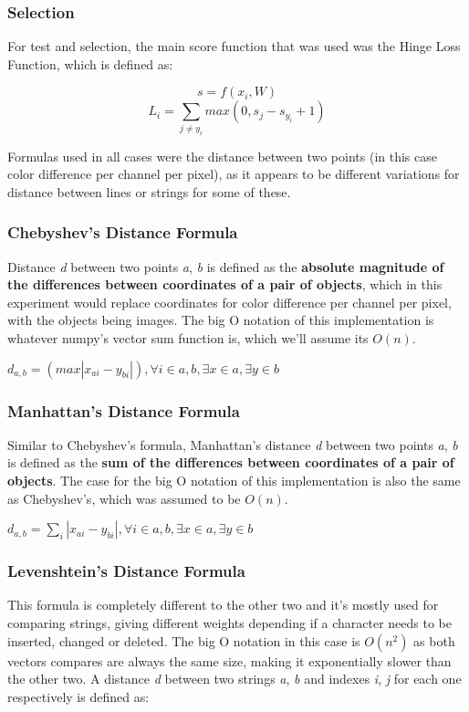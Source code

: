 \documentclass[conference,compsoc]{IEEEtran}
\begin{document}
\subsubsection{Selection}
For test and selection, the main score function that was used was the Hinge Loss Function, which is defined as:

\[ s = f(x_i, W) \]
\[L_{i} = \sum\limits_{j \ne y_i}max(0, s_j - s_{y_i} + 1)\]



Formulas used in all cases were the distance between two points (in this case color difference per channel per pixel), as it appears to be different variations for distance between lines or strings for some of these.
\subsubsection{Chebyshev's Distance Formula}
Distance \textit{d} between two points \textit{a}, \textit{b} is defined as the \textbf{absolute magnitude of the differences between coordinates of a pair of objects}, which in this experiment would replace coordinates for color difference per channel per pixel, with the objects being images. The big O notation of this implementation is whatever numpy's vector sum function is, which we'll assume its $O(n)$.

\vspace{3mm}
\(d_{a,b} =(max |x_{ai} - y_{bi}|),  \forall i \in a,b, \exists x \in a, \exists y \in b \)

\subsubsection{Manhattan's Distance Formula}
Similar to Chebyshev's formula, Manhattan's distance \textit{d} between two points \textit{a}, \textit{b} is defined as the \textbf{sum of the differences between coordinates of a pair of objects}. The case for the  big O notation of this implementation is also the same as Chebyshev's, which was assumed to be $O(n)$.

\vspace{3mm}
\(d_{a,b} = \sum_{i} |x_{ai} - y_{bi}|,  \forall i \in a,b, \exists x \in a, \exists y \in b \)

\subsubsection{Levenshtein's Distance Formula}
This formula is completely different to the other two and it's mostly used for comparing strings, giving different weights depending if a character needs to be inserted, changed or deleted. The big O notation in this case is $O(n^2)$ as both vectors compares are always the same size, making it exponentially slower than the other two. A distance \textit{d} between two strings \textit{a}, \textit{b} and indexes \textit{i}, \textit{j} for each one respectively is defined as:
\end{document}
